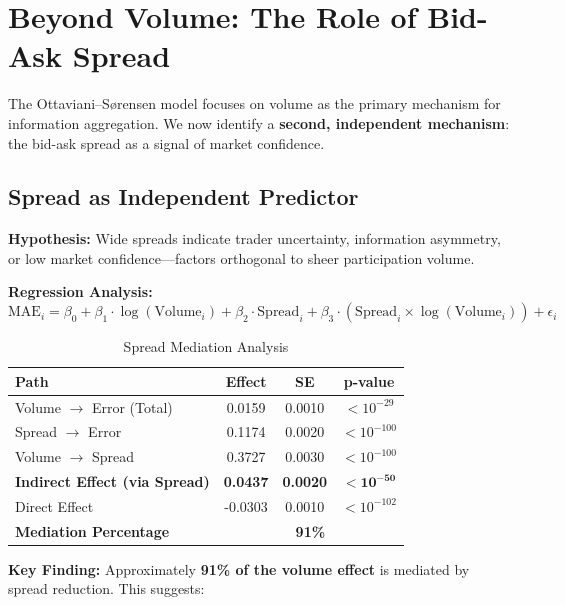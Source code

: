 \documentclass[12pt,letterpaper]{article}
\begin{document}
\clearpage
\section{Beyond Volume: The Role of Bid-Ask Spread}\label{sec:spread-mechanism}

The Ottaviani--S{\o}rensen model focuses on volume as the primary mechanism for 
information aggregation. We now identify a \textbf{second, independent mechanism}: 
the bid-ask spread as a signal of market confidence.

\subsection{Spread as Independent Predictor}

\textbf{Hypothesis:} Wide spreads indicate trader uncertainty, information asymmetry, 
or low market confidence---factors orthogonal to sheer participation volume.

\textbf{Regression Analysis:}
\begin{equation}
\text{MAE}_i = \beta_0 + \beta_1 \cdot \log(\text{Volume}_i) + \beta_2 \cdot \text{Spread}_i + \beta_3 \cdot (\text{Spread}_i \times \log(\text{Volume}_i)) + \epsilon_i
\end{equation}

\begin{table}[ht]
\centering
\caption{Spread Mediation Analysis}
\label{tab:spread-mediation}
\begin{tabular}{lccc}
\toprule
\textbf{Path} & \textbf{Effect} & \textbf{SE} & \textbf{p-value} \\
\midrule
Volume $\rightarrow$ Error (Total) & 0.0159 & 0.0010 & $< 10^{-29}$ \\
Spread $\rightarrow$ Error & 0.1174 & 0.0020 & $< 10^{-100}$ \\
Volume $\rightarrow$ Spread & 0.3727 & 0.0030 & $< 10^{-100}$ \\
\midrule
\textbf{Indirect Effect (via Spread)} & \textbf{0.0437} & \textbf{0.0020} & $\bm{< 10^{-50}}$ \\
Direct Effect & -0.0303 & 0.0010 & $< 10^{-102}$ \\
\midrule
\textbf{Mediation Percentage} & \multicolumn{3}{c}{\textbf{91\%}} \\
\bottomrule
\end{tabular}
\end{table}

\textbf{Key Finding:} Approximately \textbf{91\% of the volume effect} is mediated by 
spread reduction. This suggests:
\end{document}
